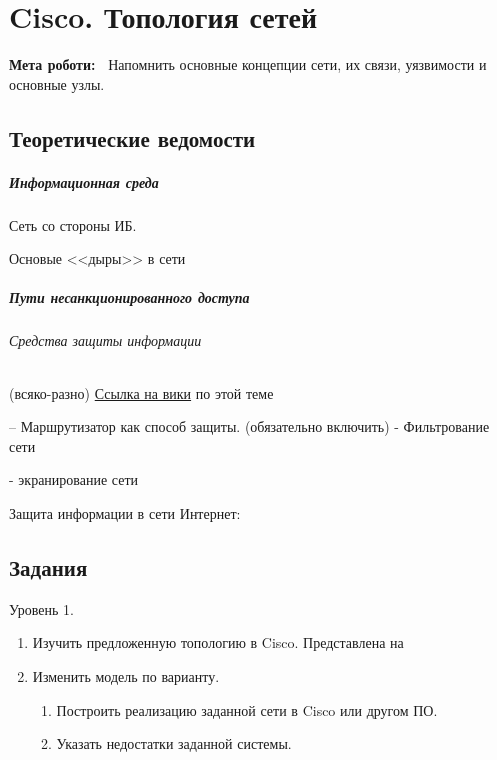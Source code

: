 \chapter{Cisco. Топология сетей} \label{chapt3}%
\textbf{Мета роботи:~}%
Напомнить основные концепции сети, их связи, уязвимости  и основные узлы.
\section{Теоретические ведомости} \label{sect3_a}
%
\paragraph{Информационная среда}

Сеть со стороны ИБ.

Основые <<дыры>> в сети

\paragraph{Пути несанкционированного доступа}


\subparagraph{Средства защиты информации}

(всяко-разно)%
\href{https://ru.wikipedia.org/wiki/%D0%97%D0%B0%D1%89%D0%B8%D1%82%D0%B0_%D0%B8%D0%BD%D1%84%D0%BE%D1%80%D0%BC%D0%B0%D1%86%D0%B8%D0%B8_%D0%B2_%D0%BB%D0%BE%D0%BA%D0%B0%D0%BB%D1%8C%D0%BD%D1%8B%D1%85_%D1%81%D0%B5%D1%82%D1%8F%D1%85}%
{Ссылка на вики} по этой теме

 -- Маршрутизатор как способ защиты. (обязательно включить)
    - Фильтрование сети

    - экранирование сети

Защита информации в сети Интернет:

\section{Задания}\label{sect3_b}
%
\noindent Уровень 1.

\begin{enumerate}
  \item Изучить предложенную топологию в Cisco. Представлена на 
  \item Изменить модель по варианту.
    \begin{enumerate}
    \item Построить реализацию заданной сети в Cisco или другом ПО.
    \item Указать недостатки заданной системы.
    \end{enumerate}
\end{enumerate}

